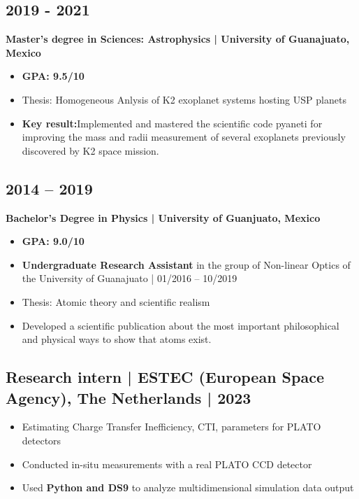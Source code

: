 \documentclass[11pt,a4paper]{article}
\begin{document}
\begin{multicols}{2}
		\subsection{2019 - 2021}
		\textbf{Master's degree in Sciences: Astrophysics | University of Guanajuato, Mexico}
		\begin{itemize}
		\item \textbf{GPA: 9.5/10}
		\item Thesis: Homogeneous Anlysis of K2 exoplanet systems hosting USP planets
		\item \textbf{Key result:}Implemented and mastered the scientific code pyaneti for improving the mass and radii measurement of several exoplanets previously discovered by K2 space mission. 
		\end{itemize}
		
		\subsection{2014 – 2019}
		\textbf{Bachelor's Degree in Physics | University of Guanjuato, Mexico}
		\begin{itemize}
			\item \textbf{GPA: 9.0/10}
			\item \textbf{Undergraduate Research Assistant} in the group of Non-linear Optics of the University of Guanajuato | 01/2016 – 10/2019
			\item Thesis: Atomic theory and scientific realism
			\item Developed a scientific publication about the most important philosophical and physical ways to show that atoms exist. 
		\end{itemize}
		
		\subsection{Research intern | ESTEC (European Space Agency), The Netherlands | 2023}
		\begin{itemize}
			\item Estimating Charge Transfer Inefficiency, CTI, parameters for PLATO detectors
			\item Conducted in-situ measurements with a real PLATO CCD detector
			\item Used \textbf{Python and DS9} to analyze multidimensional simulation data output
		\end{itemize}
		
	\end{multicols}
	
\end{document}
